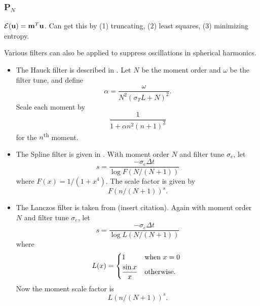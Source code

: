 \documentclass{article}
\newcommand{\closure}[1]{\ensuremath{\mathcal{E}(#1)}}
\begin{document}
\subsubsection{P$_N$}
$\closure{\bu} = \bm^T \bu$.
Can get this by (1) truncating, (2) least squares, (3) minimizing entropy.

Various filters can also be applied to suppress oscillations in spherical harmonics.

\begin{itemize}
    \item The Hauck filter is described in \cite{Hauck-McClarren-2010}.
    Let $N$ be the moment order and $\omega$ be the filter tune, and define
    \begin{equation}
        \alpha = \frac{\omega}{N^2 (\sigma_T L + N)^2}.
    \end{equation}
    Scale each moment by
    \begin{equation}
        \frac{1}{1 + \alpha n^2 (n+1)^2}
    \end{equation}
    for the $n$\textsuperscript{th} moment.

    \item The Spline filter is given in \cite{Radice-2013}.
    With moment order $N$ and filter tune $\sigma_e$, let
    \begin{equation}
        s = \frac{-\sigma_e \Delta t}{\log F(N/(N+1))}
    \end{equation}
    where $F(x) = 1/(1 + x^4)$. The scale factor is given by
    \begin{equation}
        F(n/(N+1))^s.
    \end{equation}

    \item The Lanczos filter is taken from (insert citation).
    Again with moment order $N$ and filter tune $\sigma_e$, let
    \begin{equation}
        s = \frac{-\sigma_e \Delta t}{\log L(N / (N+1))}
    \end{equation}
    where
    \begin{equation}
        L(x) = \begin{dcases*}
            1 & when $x=0$ \\
            \frac{\sin x}{x} & otherwise.
        \end{dcases*}
    \end{equation}
    Now the moment scale factor is
    \begin{equation}
        L(n / (N+1))^s.
    \end{equation}
\end{itemize}
\end{document}
